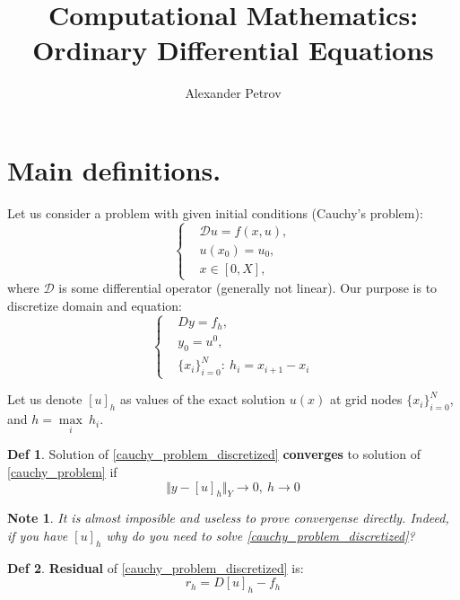\documentclass[a4paper,11pt]{article} %
\author{Alexander Petrov}
\title{Computational Mathematics: Ordinary Differential Equations}
\theoremstyle{plain} %
\newtheorem{note}{Note}[section]
\theoremstyle{definition} %
\newtheorem{defin}{Def}[section]
\theoremstyle{remark} %
\begin{document}
\maketitle

\newpage

\tableofcontents

\newpage

\section{Main definitions.}

Let us consider a problem with given initial conditions (Cauchy's problem):
\begin{equation}
\label{cauchy_problem}
	\left\{
	\begin{aligned}
	& \mathscr{D} u = f(x, u), \\
	& u(x_0) = u_0, \\
	& x \in [0, X],
	\end{aligned}
	\right.
\end{equation}
where $\mathscr{D}$ is some differential operator (generally not linear). Our purpose is to discretize domain and equation: 
\begin{equation}
\label{cauchy_problem_discretized}
\left\{
\begin{aligned}
& D y = f_h, \\
& y_0 = u^0, \\
& \{x_i\}_{i=0}^N:\ h_i = x_{i+1} - x_i
\end{aligned}
\right.
\end{equation}

Let us denote $[u]_h$ as values of the exact solution $u(x)$ at grid nodes $\{x_i\}_{i=0}^N$, and $h = \underset{i}{\max}\ h_i$.

\begin{defin}
	Solution of \eqref{cauchy_problem_discretized} \textbf{converges} to solution of \eqref{cauchy_problem} if 
	\begin{equation}
		\Vert y - [u]_h \Vert_Y \rightarrow 0,\ h \rightarrow 0
	\end{equation}
\end{defin}

\begin{note}
	It is almost imposible and useless to prove convergense directly. Indeed, if you have $[u]_h$ why do you need to solve \eqref{cauchy_problem_discretized}?
\end{note}

\begin{defin}
	\textbf{Residual} of \eqref{cauchy_problem_discretized} is:
	\begin{equation}
		r_h = D [u]_h - f_h
	\end{equation}
\end{defin}
\end{document}
